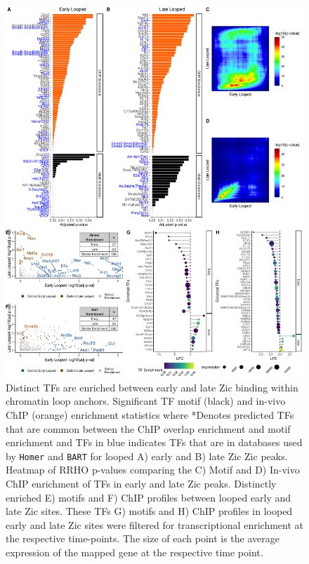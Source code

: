 \documentclass[fleqn,10pt]{wlscirep}
\begin{document}
\begin{figure}[!ht]
\centering
\includegraphics[width=.95\textwidth]{../figures/figure2_loop.png}
\caption{ Distinct TFs are enriched between early and late Zic binding within chromatin loop anchors. Significant TF motif (black) and in-vivo ChIP (orange) enrichment statistics where *Denotes predicted TFs that are common between the ChIP overlap enrichment and motif enrichment and TFs in blue indicates TFs that are in databases used by \texttt{Homer} and \texttt{BART} for looped A) early and B) late Zic Zic peaks.  Heatmap of RRHO p-values comparing the C) Motif and D) In-vivo ChIP enrichment of TFs in early and late Zic peaks. Distinctly enriched E) motifs and F) ChIP profiles between looped  early and late Zic sites. These TFs G) motifs and H) ChIP profiles in looped early and late Zic sites were filtered for transcriptional enrichment at the respective time-points. The size of each point is the average expression of the mapped gene at the respective time point.}
\label{fig:DistinctTFs_looped}
\end{figure}
\end{document}
